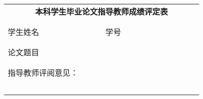 \begin{table}[h]
	\centering
	\begin{tabular}{|p{0.2\linewidth}p{0.2\linewidth}p{0.2\linewidth}p{0.2\linewidth}|}
		\hline
		\multicolumn{4}{|c|}{\large\textbf{本科学生毕业论文指导教师成绩评定表}}                                                      \\
		\multicolumn{4}{|c|}{\textbf{}}                                                                                        \\
		\hline
		\multicolumn{1}{|l|}{}         & \multicolumn{1}{|l|}{} & \multicolumn{1}{|l|}{}              & \multicolumn{1}{|l|}{} \\
		\multicolumn{1}{|l|}{学生姓名} & \multicolumn{1}{|l|}{} & \multicolumn{1}{|l|}{学号}          & \multicolumn{1}{|l|}{} \\
		\multicolumn{1}{|l|}{}         & \multicolumn{1}{|l|}{} & \multicolumn{1}{|l|}{}              & \multicolumn{1}{|l|}{} \\
		\hline
		\multicolumn{1}{|l|}{}         &                        &                                     &                        \\
		\multicolumn{1}{|l|}{论文题目} &                        &                                     &                        \\
		\multicolumn{1}{|l|}{}         &                        &                                     &                        \\
		\hline
		\multicolumn{4}{|l|}{}                                                                                                 \\
		\multicolumn{4}{|l|}{指导教师评阅意见：}                                                                               \\
		\multicolumn{4}{|l|}{}                                                                                                 \\
		\multicolumn{4}{|l|}{}                                                                                                 \\
		\multicolumn{4}{|l|}{}                                                                                                 \\
		\multicolumn{4}{|l|}{}                                                                                                 \\
		\multicolumn{4}{|l|}{}                                                                                                 \\

\end{tabular}
\end{table}
